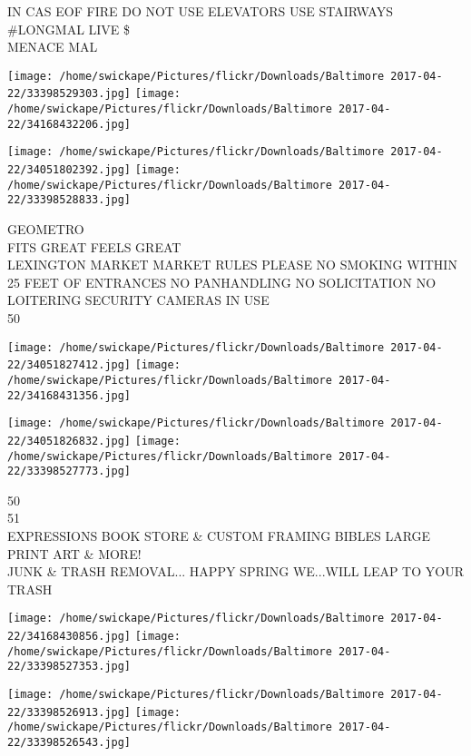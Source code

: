 \documentclass[10pt,letterpaper]{article}
\begin{document}
IN CAS EOF FIRE DO NOT USE ELEVATORS USE STAIRWAYS\\
\#LONGMAL LIVE \$\\
MENACE MAL\\
\pagebreak

\texttt{[image: /home/swickape/Pictures/flickr/Downloads/Baltimore 2017-04-22/33398529303.jpg]}
\texttt{[image: /home/swickape/Pictures/flickr/Downloads/Baltimore 2017-04-22/34168432206.jpg]}

\texttt{[image: /home/swickape/Pictures/flickr/Downloads/Baltimore 2017-04-22/34051802392.jpg]}
\texttt{[image: /home/swickape/Pictures/flickr/Downloads/Baltimore 2017-04-22/33398528833.jpg]}

GEOMETRO\\
FITS GREAT FEELS GREAT\\
LEXINGTON MARKET MARKET RULES PLEASE NO SMOKING WITHIN 25 FEET OF ENTRANCES NO PANHANDLING NO SOLICITATION NO LOITERING SECURITY CAMERAS IN USE\\
50\\
\pagebreak

\texttt{[image: /home/swickape/Pictures/flickr/Downloads/Baltimore 2017-04-22/34051827412.jpg]}
\texttt{[image: /home/swickape/Pictures/flickr/Downloads/Baltimore 2017-04-22/34168431356.jpg]}

\texttt{[image: /home/swickape/Pictures/flickr/Downloads/Baltimore 2017-04-22/34051826832.jpg]}
\texttt{[image: /home/swickape/Pictures/flickr/Downloads/Baltimore 2017-04-22/33398527773.jpg]}

50\\
51\\
EXPRESSIONS BOOK STORE \& CUSTOM FRAMING BIBLES LARGE PRINT ART \& MORE!\\
JUNK \& TRASH REMOVAL... HAPPY SPRING WE...WILL LEAP TO YOUR TRASH\\
\pagebreak

\texttt{[image: /home/swickape/Pictures/flickr/Downloads/Baltimore 2017-04-22/34168430856.jpg]}
\texttt{[image: /home/swickape/Pictures/flickr/Downloads/Baltimore 2017-04-22/33398527353.jpg]}

\texttt{[image: /home/swickape/Pictures/flickr/Downloads/Baltimore 2017-04-22/33398526913.jpg]}
\texttt{[image: /home/swickape/Pictures/flickr/Downloads/Baltimore 2017-04-22/33398526543.jpg]}
\end{document}
